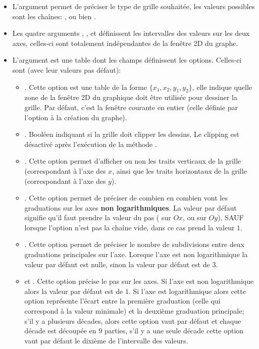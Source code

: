  \begin{itemize}
     \item L'argument  permet de préciser le type de grille souhaitée, les valeurs possibles sont les chaînes: ,  ou bien .
    \item Les quatre arguments , ,  et  définissent les intervalles des valeurs sur les deux axes, celles-ci sont totalement indépendantes de la fenêtre 2D du graphe.
    \item L'argument est une table dont les champs définissent les options. Celles-ci sont (avec leur valeurs pas défaut):
    \begin{itemize}
         \item {}. Cette option est une table de la forme $\{x_1,x_2,y_1,y_2\}$, elle indique quelle zone de la fenêtre 2D du graphique doit être utilisée pour dessiner la grille. Par défaut, c'est la fenêtre courante en entier (celle définie par l'option  à la création du graphe).
         
         \item {}. Booléen indiquant si la grille doit clipper les dessins. Le clipping est désactivé après l'exécution de la méthode .
         
        \item {}. Cette option permet d'afficher ou non les traits verticaux de la grille (correspondant à l'axe des $x$, ainsi que les traits horizontaux de la grille (correspondant à l'axe des $y$).
                
        \item {}. Cette option permet de préciser de combien en combien vont les graduations sur les axes \textbf{non logarithmiques}. La valeur par défaut signifie qu'il faut prendre la valeur du pas ( sur $Ox$, ou  sur $Oy$), SAUF lorsque l'option  n'est pas la chaîne vide, dans ce cas  prend la valeur $1$.
        
        \item {}. Cette option permet de préciser le nombre de subdivisions entre deux graduations principales sur l'axe. Lorsque l'axe est non logarithmique la valeur par défaut est nulle, sinon la valeur par défaut est de $3$.
        
        \item {} et . Cette option précise le pas sur les axes. Si l'axe est non logarithmique alors la valeur par défaut est de $1$. Si l'axe est logarithmique alors cette option représente l’écart entre la première graduation (celle qui correspond à la valeur minimale) et la deuxième graduation principale; s’il y a plusieurs décades, alors cette option vaut  par défaut et chaque décade est découpée en $9$ parties, s’il y a une seule décade cette option vaut par défaut le dixième de l’intervalle des valeurs.
        

\end{itemize}
\end{itemize}
